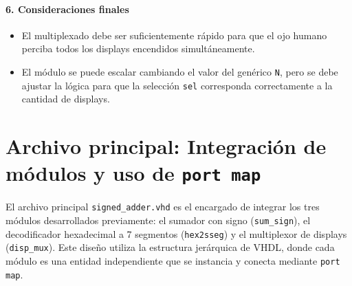 \documentclass[a4paper,12pt]{article}
\begin{document}
\paragraph{6. Consideraciones finales}

\begin{itemize}
  \item El multiplexado debe ser suficientemente rápido para que el ojo humano perciba todos los displays encendidos simultáneamente.
  \item El módulo se puede escalar cambiando el valor del genérico \texttt{N}, pero se debe ajustar la lógica para que la selección \texttt{sel} corresponda correctamente a la cantidad de displays.
\end{itemize}

\section{Archivo principal: Integración de módulos y uso de \texttt{port map}}

El archivo principal \texttt{signed\_adder.vhd} es el encargado de integrar los tres módulos desarrollados previamente: el sumador con signo (\texttt{sum\_sign}), el decodificador hexadecimal a 7 segmentos (\texttt{hex2sseg}) y el multiplexor de displays (\texttt{disp\_mux}).  
Este diseño utiliza la estructura jerárquica de VHDL, donde cada módulo es una entidad independiente que se instancia y conecta mediante \texttt{port map}.
\end{document}

